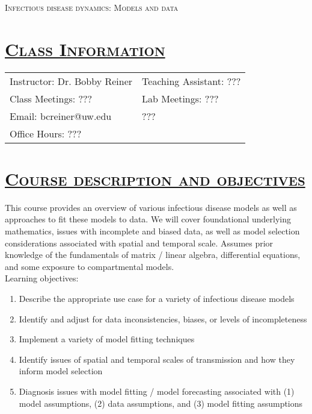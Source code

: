 \documentclass[fancyhdr,10pt]{article}
\renewcommand{\arraystretch}{1.4}
\begin{document}
\hbox{}\vspace{-.6in}
\begin{center}
\LARGE\textsc{Infectious disease dynamics: Models and data}
\end{center}


\section*{\underline{\textsc{Class Information}}}


  \begin{tabular}{m{3.5in} m{4.5in}}
Instructor: Dr. Bobby Reiner & Teaching Assistant: ???\\
Class Meetings: ??? & Lab Meetings: ???\\
Email: bcreiner@uw.edu & ???\\
Office Hours: ???\\
\end{tabular}

\renewcommand{\arraystretch}{1.2}
\section*{\underline{\textsc{Course description and objectives}}}
This course provides an overview of various infectious disease models as well as approaches to fit these models to data. We will cover foundational underlying mathematics, issues with incomplete and biased data, as well as model selection considerations associated with spatial and temporal scale. Assumes prior knowledge of the fundamentals of matrix / linear algebra, differential equations, and some exposure to compartmental models.\\

\noindent Learning objectives:\\
\begin{enumerate}
 \item Describe the appropriate use case for a variety of infectious disease models
 \item Identify and adjust for data inconsistencies, biases, or levels of incompleteness
 \item Implement a variety of model fitting techniques
 \item Identify issues of spatial and temporal scales of transmission and how they inform model selection
 \item Diagnosis issues with model fitting / model forecasting associated with (1) model assumptions, (2) data assumptions, and (3) model fitting assumptions
\end{enumerate}
\end{document}
